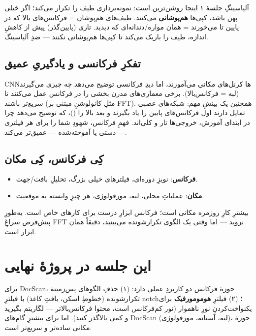 \documentclass[12pt,a4paper]{article}
\begin{document}
آلیاسینگِ جلسهٔ ۱ اینجا روشن‌ترین است: نمونه‌برداری طیف را تکرار می‌کند؛ اگر خیلی پهن باشد،
کپی‌ها \textbf{هم‌پوشانی} می‌کنند. طیف‌های هم‌پوشان = فرکانس‌های بالا که در پایین تا می‌خورند = همان
مواره/دندانه‌ای که دیدید. تاری (پایین‌گذر) پیش از کاهشِ اندازه، طیف را باریک می‌کند تا کپی‌ها
هم‌پوشانی نکنند — ضدِ آلیاسینگ.

\subsection{تفکرِ فرکانسی و یادگیریِ عمیق}

CNNها کرنل‌های مکانی می‌آموزند، اما دیدِ فرکانسی توضیح می‌دهد چه چیزی می‌گیرند (لبه = فرکانس‌بالا).
برخی معماری‌های مدرن بخشی را در فرکانس عمل می‌کنند تا سریع‌تر باشند (مثلِ کانولوشنِ مبتنی بر FFT).
همچنین یک بینشِ مهم: شبکه‌های عصبی تمایل دارند اول فرکانس‌های پایین را یاد بگیرند و بعد بالا را
()، که توضیح می‌دهد چرا در ابتدای آموزش، خروجی‌ها تار و کلی‌اند. فهمِ فرکانس،
شهودِ شما را برای هر فیلتری — دستی یا آموخته‌شده — عمیق‌تر می‌کند.

\subsection{کِی فرکانس، کِی مکان}

\begin{itemize}
  \item \textbf{فرکانس}: نویزِ دوره‌ای، فیلترهای خیلی بزرگ، تحلیلِ بافت/جهت.
  \item \textbf{مکان}: عملیاتِ محلی، لبه، مورفولوژی، هر چیزِ وابسته به موقعیت.
\end{itemize}

بیشترِ کارِ روزمره مکانی است؛ فرکانس ابزارِ درست برای کارهای خاص است. به‌طورِ پیش‌فرض سراغِ FFT
نروید — اما وقتی یک الگوی تکرارشونده می‌بینید، دقیقاً همان ابزار است.

\section{این جلسه در پروژهٔ نهایی}

برای DocScan، حوزهٔ فرکانس دو کاربردِ عملی دارد: (۱) حذفِ الگوهای پس‌زمینهٔ تکرارشونده (خطوطِ
اسکن، بافتِ کاغذ) با فیلترِ notch؛ (۲) فیلترِ \textbf{هومومورفیک} برای یکنواخت‌کردنِ نورِ ناهموار
(نور کم‌فرکانس است، محتوا فرکانس‌بالاتر — لگاریتم بگیرید و کمی بالاگذر کنید). اما برای بیشترِ
گام‌های DocScan (لبه، آستانه، مورفولوژی)، حوزهٔ مکانی ساده‌تر و سریع‌تر است.
\end{document}
